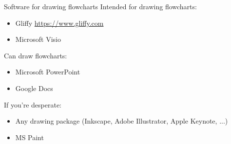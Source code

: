 \begin{frame}{Software for drawing flowcharts}
	\pause Intended for drawing flowcharts:
	\begin{itemize}
		\item Gliffy \url{https://www.gliffy.com}
		\item Microsoft Visio
	\end{itemize}
	\pause Can draw flowcharts:
	\begin{itemize}
		\item Microsoft PowerPoint
		\item Google Docs
	\end{itemize}
	\pause If you're desperate:
	\begin{itemize}
		\item Any drawing package (Inkscape, Adobe Illustrator, Apple Keynote, ...)
		\item MS Paint
	\end{itemize}
\end{frame}

